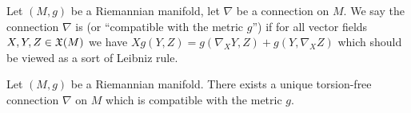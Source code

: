 

\begin{definition}
Let $(M, g)$ be a Riemannian manifold, let $\nabla$ be a connection on
$M$. We say the connection $\nabla$ is  (or
``compatible with the metric $g$'') if for all vector fields
$X,Y,Z\in\mathfrak{X}(M)$ we have $Xg(Y,Z)=g(\nabla_{X}Y,Z)+g(Y,\nabla_{X}Z)$
which should be viewed as a sort of Leibniz rule.
\end{definition}

\begin{theorem}\label{thm:fundamental:riemannian-geometry}
Let $(M, g)$ be a Riemannian manifold. There exists a unique
torsion-free connection $\nabla$ on $M$ which is compatible with the
metric $g$.
\end{theorem}

